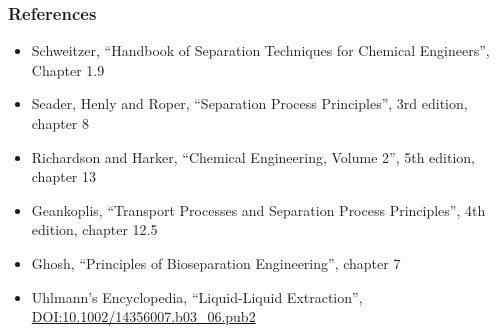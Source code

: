 \begin{frame}\frametitle{References}
	\begin{itemize}
		\item	Schweitzer, ``Handbook of Separation Techniques for Chemical Engineers'', Chapter 1.9
		\item	Seader, Henly and Roper, ``Separation Process Principles'', 3rd edition, chapter 8
		\item	Richardson and Harker, ``Chemical Engineering, Volume 2'', 5th edition, chapter 13
		\item	Geankoplis, ``Transport Processes and Separation Process Principles'', 4th edition, chapter 12.5
		\item	Ghosh, ``Principles of Bioseparation Engineering'', chapter 7
		\item	Uhlmann's Encyclopedia, ``Liquid-Liquid Extraction'',  \href{http://dx.doi.org/10.1002/14356007.b03\_06.pub2}{DOI:10.1002/14356007.b03\_06.pub2}
	\end{itemize}
\end{frame}

